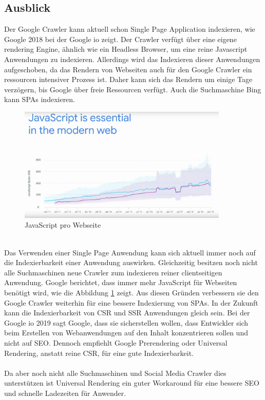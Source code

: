 \documentclass[runningheads]{llncs}
\begin{document}
\subsection{Ausblick}
\label{subsec:Ausblick}
Der Google Crawler kann aktuell schon Single Page Application indexieren, 
wie Google 2018 bei der Google io zeigt. 
Der Crawler verfügt über eine eigene rendering Engine, 
ähnlich wie ein Headless Browser, 
um eine reine Javascript Anwendungen zu indexieren. 
Allerdings wird das Indexieren dieser Anwendungen aufgeschoben, 
da das Rendern von Webseiten auch für den Google Crawler 
ein ressourcen intensiver Prozess ist. 
Daher kann sich das Rendern um einige Tage verzögern, 
bis Google über freie Ressourcen verfügt. 
Auch die Suchmaschine Bing kann SPAs indexieren. \cite{GoogleSearchAndJS} \cite{SearchFriendly}
\begin{figure}
  \centering
  \includegraphics[width=10cm]{images/JavaScriptGoogleShips}
  \caption{JavaScript pro Webseite \cite{SearchFriendly}}
  \label{JavaScript pro Website}
\end{figure}
\\
Das Verwenden einer Single Page Anwendung 
kann sich aktuell immer noch auf die Indexierbarkeit einer Anwendung auswirken. 
Gleichzeitig besitzen noch nicht alle Suchmaschinen neue Crawler 
zum indexieren reiner clientseitigen Anwendung. 
Google berichtet, dass immer mehr JavaScript für Webseiten benötigt wird, 
wie die Abbildung \ref{JavaScript pro Website} zeigt. 
Aus diesen Gründen verbessern sie den Google Crawler weiterhin für eine bessere Indexierung von SPAs. 
In der Zukunft kann die Indexierbarkeit von CSR und SSR Anwendungen gleich sein. 
Bei der Google io 2019 sagt Google, 
dass sie sicherstellen wollen, 
dass Entwickler sich beim Erstellen von Webanwendungen auf den Inhalt konzentrieren sollen und nicht auf SEO. 
Dennoch empfiehlt Google Prerendering oder Universal Rendering, 
anstatt reine CSR, für eine gute Indexierbarkeit. \cite{WebPerfomance}
\\
\\
Da aber noch nicht alle Suchmaschinen und 
Social Media Crawler dies unterstützen ist Universal Rendering ein 
guter Workaround für eine bessere SEO und schnelle Ladezeiten für Anwender.


\newpage
%


\end{document}
